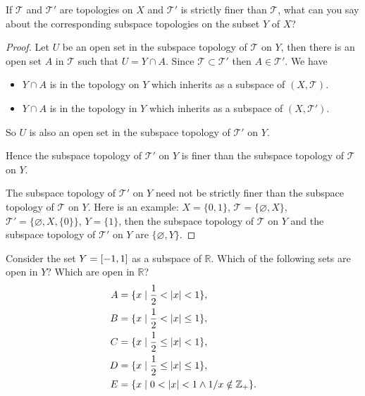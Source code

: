 \begin{exercise}\label{chapter2:section16:exercise2}
    If $\mathscr{T}$ and $\mathscr{T}'$ are topologies on $X$ and $\mathscr{T}'$ is strictly finer than $\mathscr{T}$, what can you say about the corresponding subspace topologies on the subset $Y$ of $X$?
\end{exercise}

\begin{proof}
    Let $U$ be an open set in the subspace topology of $\mathscr{T}$ on $Y$, then there is an open set $A$ in $\mathscr{T}$ such that $U = Y\cap A$. Since $\mathscr{T}\subset\mathscr{T}'$ then $A\in \mathscr{T}'$. We have
    \begin{itemize}[itemsep=0pt]
        \item $Y\cap A$ is in the topology on $Y$ which inherits as a subspace of $(X, \mathscr{T})$.
        \item $Y\cap A$ is in the topology in $Y$ which inherits as a subspace of $(X, \mathscr{T}')$.
    \end{itemize}

    So $U$ is also an open set in the subspace topology of $\mathscr{T}'$ on $Y$.

    Hence the subspace topology of $\mathscr{T}'$ on $Y$ is finer than the subspace topology of $\mathscr{T}$ on $Y$.

    The subspace topology of $\mathscr{T}'$ on $Y$ need not be strictly finer than the subspace topology of $\mathscr{T}$ on $Y$. Here is an example: $X = \{ 0, 1 \}$, $\mathscr{T} = \{ \varnothing, X \}$, $\mathscr{T}' = \{ \varnothing, X, \{ 0 \} \}$, $Y = \{ 1 \}$, then the subspace topology of $\mathscr{T}$ on $Y$ and the subspace topology of $\mathscr{T}'$ on $Y$ are $\{ \varnothing, Y \}$.
\end{proof}

\begin{exercise}\label{chapter2:section16:exercise3}
    Consider the set $Y = \left[{-1, 1}\right]$ as a subspace of $\mathbb{R}$. Which of the following sets are open in $Y$? Which are open in $\mathbb{R}$?
    \begin{align*}
        A & = \{ x \mid \frac{1}{2} < \left\vert{x}\right\vert < 1 \}, \\
        B & = \{ x \mid \frac{1}{2} < \left\vert{x}\right\vert \leq 1 \}, \\
        C & = \{ x \mid \frac{1}{2} \leq \left\vert{x}\right\vert < 1 \}, \\
        D & = \{ x \mid \frac{1}{2} \leq \left\vert{x}\right\vert \leq 1 \}, \\
        E & = \{ x \mid 0 < \left\vert{x}\right\vert < 1 \land 1/x \notin \mathbb{Z}_{+} \}.
    \end{align*}
\end{exercise}

